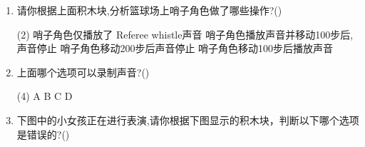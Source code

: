 \documentclass[10pt, a4paper]{article}
\begin{document}
\begin{enumerate}
        \item 请你根据上面积木块,分析篮球场上哨子角色做了哪些操作?(\qquad)
        \begin{tasks}(2)
            \task 哨子角色仅播放了 Referee whistle声音
            \task 哨子角色播放声音并移动100步后,声音停止
            \task 哨子角色移动200步后声音停止
            \task 哨子角色移动100步后播放声音
        \end{tasks}

        \item 上面哪个选项可以录制声音?(\qquad)
        \begin{tasks}(4)
            \task A
            \task B
            \task C
            \task D
        \end{tasks}

        \item 下图中的小女孩正在进行表演,请你根据下图显示的积木块，判断以下哪个选项是错误的?(\qquad)
        \begin{figure}[htbp]
            \centering
            \begin{minipage}{.12\textwidth}
                \centering

\end{minipage}
\end{figure}
\end{enumerate}
\end{document}
